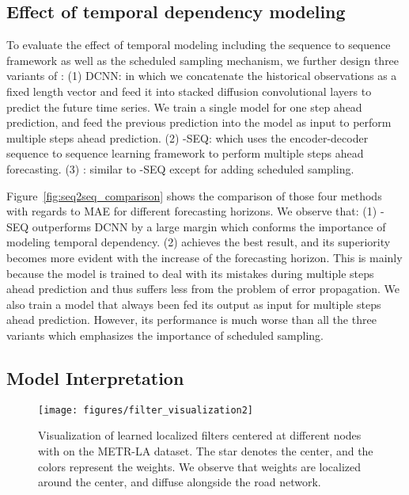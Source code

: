 \subsection{Effect of temporal dependency modeling}

To evaluate the effect of temporal modeling including the sequence to sequence framework as well as the scheduled sampling mechanism, we further design three variants of \gcrnn{}: 
(1) DCNN: in which we concatenate the historical observations as a fixed length vector and feed it into stacked diffusion convolutional layers to predict the future time series.
We train a single model for one step ahead prediction, and feed the previous prediction into the model as input to perform multiple steps ahead prediction.
(2) \gcrnn{}-SEQ: which uses the encoder-decoder sequence to sequence learning framework to perform multiple steps ahead forecasting.
(3) \gcrnn{}: similar to \gcrnn{}-SEQ except for adding scheduled sampling.

Figure~\ref{fig:seq2seq_comparison} shows the comparison of those four methods with regards to MAE for different forecasting horizons. We observe that:
(1) \gcrnn{}-SEQ outperforms DCNN by a large margin which conforms the importance of modeling temporal dependency.
(2) \gcrnn{} achieves the best result, and its superiority becomes more evident with the increase of the forecasting horizon. 
This is mainly because the model is trained to deal with its mistakes during multiple steps ahead prediction and thus suffers less from the problem of error propagation. 
We also train a model that always been fed its output as input for multiple steps ahead prediction. However, its performance is much worse than all the three variants which emphasizes the importance of scheduled sampling.

\vspace{-0.1in}
\subsection{Model Interpretation}
\vspace{-0.1in}
\begin{figure*}[tp]
    \centering
	\texttt{[image: figures/filter\_visualization2]}
\caption{Visualization of learned localized filters centered at different nodes with  on the METR-LA dataset. The star denotes the center, and the colors represent the weights. We observe that weights are localized around the center, and diffuse alongside the road network.}
	\label{fig:filter_visualization}
\end{figure*}

